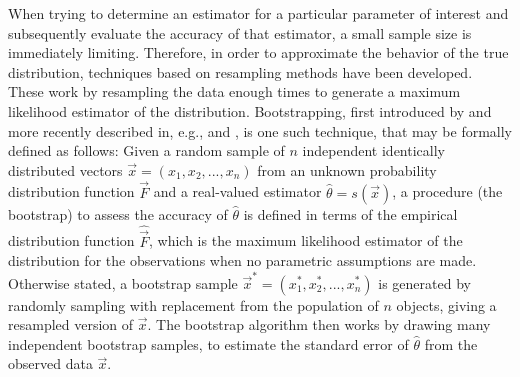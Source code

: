 \documentclass[structabstract]{aa}
\begin{document}
When trying to determine an estimator for a particular parameter of interest and subsequently evaluate the accuracy of that estimator, a small sample size is immediately limiting. Therefore, in order to approximate the behavior of the true distribution, techniques based on resampling methods have been developed. These work by resampling the data enough times to generate a maximum likelihood estimator of the distribution. Bootstrapping, first introduced by \citet{Efron:1979p1831} and more recently described in, e.g., \citet{1994.book.Efron} and \citet{Chernick1999}, is one such technique, that may be formally defined as follows: Given a random sample of $n$ independent identically distributed vectors $\vec{x} = \left( x_1, x_2, ..., x_n \right)$ from an unknown probability distribution function $\vec{F}$ and a real-valued estimator $\hat{\theta} = s \left( \vec{x} \right)$, a procedure (the bootstrap) to assess the accuracy of $\hat{\theta}$ is defined in terms of the empirical distribution function $\hat{\vec{F}}$, which is the maximum likelihood estimator of the distribution for the observations when no parametric assumptions are made. Otherwise stated, a bootstrap sample $\vec{x}^* = \left( x_1^*, x_2^*, ..., x_n^* \right)$ is generated by randomly sampling with replacement from the population of $n$ objects, giving a resampled version of $\vec{x}$. The bootstrap algorithm then works by drawing many independent bootstrap samples, to estimate the standard error of $\hat{\theta}$ from the observed data $\vec{x}$.
\end{document}
